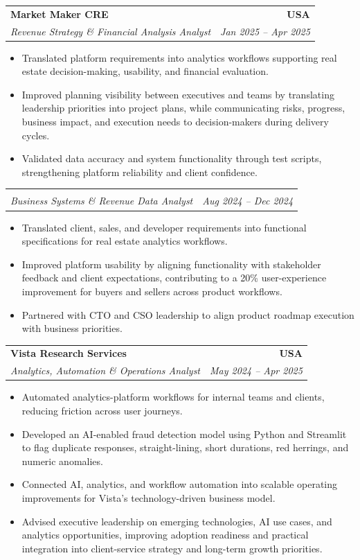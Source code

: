 \documentclass[letterpaper,10pt]{article}
\makeatletter
\newcommand{\resumeItem}[1]{\item \small{#1}}
\newcommand{\resumeSubheading}[4]{
  \vspace{1pt}\item
    \begin{tabular*}{1.0\textwidth}[t]{l@{\extracolsep{\fill}}r}
      \textbf{#1} & \textbf{\small #2} \\
      \textit{\small #3} & \textit{\small #4} \\
    \end{tabular*}\vspace{-6pt}
}
\newcommand{\resumeItemListStart}{\begin{itemize}[leftmargin=0.15in, itemsep=1pt, topsep=3pt]}
\newcommand{\resumeItemListEnd}{\end{itemize}\vspace{-2pt}}
\makeatother
\begin{document}
\vspace{-2pt}

\resumeSubheading
{Market Maker CRE}{USA}
{Revenue Strategy \& Financial Analysis Analyst}{Jan 2025 -- Apr 2025}
\resumeItemListStart
\resumeItem{Translated platform requirements into analytics workflows supporting real estate decision-making, usability, and financial evaluation.}
\resumeItem{Improved planning visibility between executives and teams by translating leadership priorities into project plans, while communicating risks, progress, business impact, and execution needs to decision-makers during delivery cycles.}
\resumeItem{Validated data accuracy and system functionality through test scripts, strengthening platform reliability and client confidence.}
\resumeItemListEnd

\vspace{-2pt}

\resumeSubheading
{}{}
{Business Systems \& Revenue Data Analyst}{Aug 2024 -- Dec 2024}
\resumeItemListStart
\resumeItem{Translated client, sales, and developer requirements into functional specifications for real estate analytics workflows.}
\resumeItem{Improved platform usability by aligning functionality with stakeholder feedback and client expectations, contributing to a 20\% user-experience improvement for buyers and sellers across product workflows.}
\resumeItem{Partnered with CTO and CSO leadership to align product roadmap execution with business priorities.}
\resumeItemListEnd

\vspace{-2pt}

\resumeSubheading
{Vista Research Services}{USA}
{Analytics, Automation \& Operations Analyst}{May 2024 -- Apr 2025}
\resumeItemListStart
\resumeItem{Automated analytics-platform workflows for internal teams and clients, reducing friction across user journeys.}
\resumeItem{Developed an AI-enabled fraud detection model using Python and Streamlit to flag duplicate responses, straight-lining, short durations, red herrings, and numeric anomalies.}
\resumeItem{Connected AI, analytics, and workflow automation into scalable operating improvements for Vista's technology-driven business model.}
\resumeItem{Advised executive leadership on emerging technologies, AI use cases, and analytics opportunities, improving adoption readiness and practical integration into client-service strategy and long-term growth priorities.}
\resumeItemListEnd

\vspace{-2pt}
\end{document}

